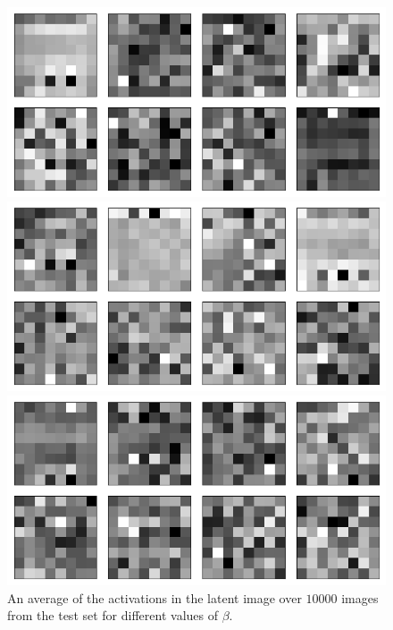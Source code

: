 \begin{figure}[h!]
\centering
\captionsetup{justification=centering}

    \includegraphics[scale=0.3]{figures/results/indiscriminate_decoupling/beta_1_average_activation.png}
    \caption{$\beta=1$}
    \includegraphics[scale=0.3]{figures/results/indiscriminate_decoupling/beta_2_average_activation.png}
    \caption{$\beta=2$}
    \includegraphics[scale=0.3]{figures/results/indiscriminate_decoupling/beta_4_average_activation.png}
    \caption{$\beta=4$}

\caption{An average of the activations in the latent image over $10000$ images from the test set for different values of $\beta$.}
\label{fig:indiscriminate_decoupling_originals_posterior_samples}
\end{figure}





